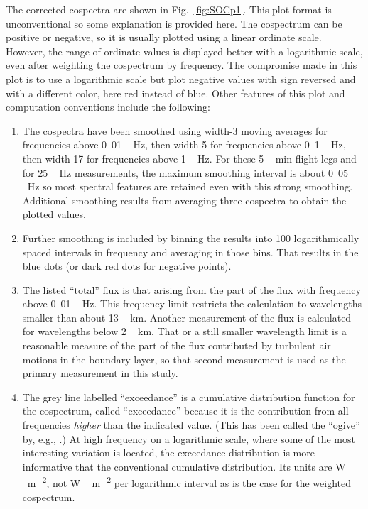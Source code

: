 \documentclass[amt, manuscript]{copernicus}
\begin{document}
The corrected cospectra are shown in Fig.~\ref{fig:SOCp1}. This plot
format is unconventional so some explanation is provided here. The
cospectrum can be positive or negative, so it is usually plotted using a
linear ordinate scale. However, the range of ordinate values is
displayed better with a logarithmic scale, even after weighting the
cospectrum by frequency. The compromise made in this plot is to use a
logarithmic scale but plot negative values with sign reversed and with a
different color, here red instead of blue. Other features of this plot
and computation conventions include the following:

\begin{enumerate}
\def\labelenumi{\arabic{enumi}.}
\item
  The cospectra have been smoothed using width-3 moving averages for
  frequencies above \unit{0.01\,Hz}, then width-5 for frequencies above
  \unit{0.1\,Hz}, then width-17 for frequencies above \unit{1\,Hz}. For
  these \unit{5\,min} flight legs and for \unit{25\,Hz} measurements,
  the maximum smoothing interval is about \unit{0.05\,Hz} so most
  spectral features are retained even with this strong smoothing.
  Additional smoothing results from averaging three cospectra to obtain
  the plotted values.
\item
  Further smoothing is included by binning the results into 100
  logarithmically spaced intervals in frequency and averaging in those
  bins. That results in the blue dots (or dark red dots for negative
  points).
\item
  The listed ``total'' flux is that arising from the part of the flux
  with frequency above \unit{0.01\,Hz}. This frequency limit restricts
  the calculation to wavelengths smaller than about \unit{13\,km}.
  Another measurement of the flux is calculated for wavelengths below
  \unit{2\,km}. That or a still smaller wavelength limit is a reasonable
  measure of the part of the flux contributed by turbulent air motions
  in the boundary layer, so that second measurement is used as the
  primary measurement in this study.
\item
  The grey line labelled ``exceedance'' is a cumulative distribution
  function for the cospectrum, called ``exceedance'' because it is the
  contribution from all frequencies \emph{higher} than the indicated
  value. (This has been called the ``ogive'' by, e.g.,
  \citet{Foken2006ACPclosure}.) At high frequency on a logarithmic
  scale, where some of the most interesting variation is located, the
  exceedance distribution is more informative that the conventional
  cumulative distribution. Its units are \unit{W\,m^{-2}}, not
  \unit{W\,m^{-2}} per logarithmic interval as is the case for the
  weighted cospectrum.
\end{enumerate}
\end{document}
